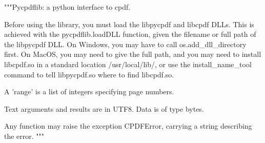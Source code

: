 """Pycpdflib: a python interface to cpdf.

Before using the library, you must load the libpycpdf and libcpdf DLLs. This is
achieved with the pycpdflib.loadDLL function, given the filename or full path
of the libpycpdf DLL.  On Windows, you may have to call os.add_dll_directory
first. On MacOS, you may need to give the full path, and you may need to
install libcpdf.so in a standard location /usr/local/lib/, or use the
install_name_tool command to tell libpycpdf.so where to find libcpdf.so.

A 'range' is a list of integers specifying page numbers.

Text arguments and results are in UTF8. Data is of type bytes.

Any function may raise the exception CPDFError, carrying a string describing
the error. """
